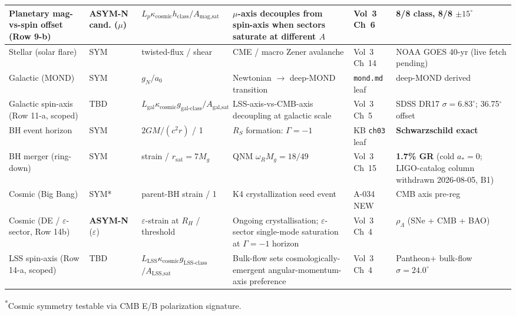 \begin{center}
\begin{tabular}{|p{1.5cm}|p{0.9cm}|p{2.2cm}|p{2.5cm}|p{2.6cm}|p{2.0cm}|}
\hline
Planetary mag-vs-spin offset (Row 9-b) & \textbf{ASYM-N cand.} ($\mu$) & $L_p \kappa_{\text{cosmic}} h_{\text{class}} / A_{\text{mag,sat}}$ & $\mu$-axis decouples from spin-axis when sectors saturate at different $A$ & Vol~3 Ch~6 & 8/8 class, 8/8 $\pm 15^\circ$ \\
\hline
Stellar (solar flare) & SYM & twisted-flux / shear & CME / macro Zener avalanche & Vol~3 Ch~14 & NOAA GOES 40-yr (live fetch pending) \\
\hline
Galactic (MOND) & SYM & $g_N/a_0$ & Newtonian $\to$ deep-MOND transition & \texttt{mond.md} leaf & deep-MOND derived \\
\hline
Galactic spin-axis (Row 11-a, scoped) & TBD & $L_{\text{gal}} \kappa_{\text{cosmic}} g_{\text{gal-class}} / A_{\text{gal,sat}}$ & LSS-axis-vs-CMB-axis decoupling at galactic scale & Vol~3 Ch~5 & SDSS DR17 $\sigma=6.83^\circ$; 36.75$^\circ$ offset \\
\hline
BH event horizon & SYM & $2GM/(c^2 r)$ / 1 & $R_S$ formation: $\Gamma=-1$\gammaundeclared{} & KB \texttt{ch03} leaf & \textbf{Schwarzschild exact} \\
\hline
BH merger (ring-down) & SYM & strain / $r_{\text{sat}}=7M_g$ & QNM $\omega_R M_g = 18/49$ & Vol~3 Ch~15 & \textbf{1.7\% GR} (cold $a_*=0$; LIGO-catalog column withdrawn 2026-08-05, B1) \\
\hline
Cosmic (Big Bang) & SYM* & parent-BH strain / 1 & K4 crystallization seed event & A-034 NEW & CMB axis pre-reg \\
\hline
Cosmic (DE / $\varepsilon$-sector, Row 14b) & \textbf{ASYM-N} ($\varepsilon$) & $\varepsilon$-strain at $R_H$ / threshold & Ongoing crystallisation; $\varepsilon$-sector single-mode saturation at $\Gamma=-1$\gammaundeclared{} horizon & Vol~3 Ch~4 & $\rho_\Lambda$ (SNe + CMB + BAO) \\
\hline
LSS spin-axis (Row 14-a, scoped) & TBD & $L_{\text{LSS}} \kappa_{\text{cosmic}} g_{\text{LSS-class}}$\allowbreak${} / A_{\text{LSS,sat}}$ & Bulk-flow sets cosmologically-emergent angular-momentum-axis preference & Vol~3 Ch~4 & Pantheon+ bulk-flow $\sigma=24.0^\circ$ \\
\hline
\end{tabular}
\end{center}
\textsuperscript{*}Cosmic symmetry testable via CMB E/B polarization signature.

